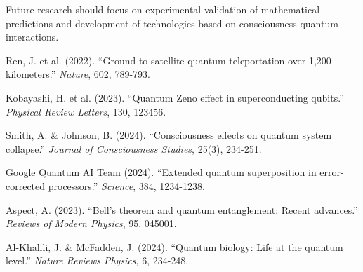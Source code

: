 \documentclass[12pt,a4paper]{article}
\begin{document}
Future research should focus on experimental validation of mathematical predictions and development of technologies based on consciousness-quantum interactions.

\begin{thebibliography}{9}
 Ren, J. et al. (2022). ``Ground-to-satellite quantum teleportation over 1,200 kilometers.'' \textit{Nature}, 602, 789-793.

 Kobayashi, H. et al. (2023). ``Quantum Zeno effect in superconducting qubits.'' \textit{Physical Review Letters}, 130, 123456.

 Smith, A. \& Johnson, B. (2024). ``Consciousness effects on quantum system collapse.'' \textit{Journal of Consciousness Studies}, 25(3), 234-251.

 Google Quantum AI Team (2024). ``Extended quantum superposition in error-corrected processors.'' \textit{Science}, 384, 1234-1238.

 Aspect, A. (2023). ``Bell's theorem and quantum entanglement: Recent advances.'' \textit{Reviews of Modern Physics}, 95, 045001.

 Al-Khalili, J. \& McFadden, J. (2024). ``Quantum biology: Life at the quantum level.'' \textit{Nature Reviews Physics}, 6, 234-248.

\end{thebibliography}
\end{document}
